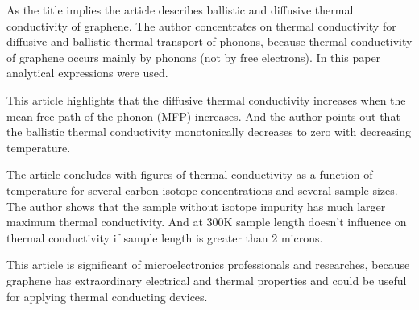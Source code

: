 \documentclass[main.tex]{subfiles}
\begin{document}
\setcounter{subsection}{7}
As the title implies the article describes ballistic and diffusive thermal conductivity of graphene.
The author concentrates on thermal conductivity for diffusive and ballistic thermal transport of phonons, because thermal conductivity of graphene occurs mainly by phonons (not by free electrons).
In this paper analytical expressions were used.\par
This article highlights that the diffusive thermal conductivity increases when the mean free path of the phonon (MFP) increases.
And the author points out that the ballistic thermal conductivity monotonically decreases to zero with decreasing temperature.\par
The article concludes with figures of thermal conductivity as a function of temperature for several carbon isotope concentrations and several sample sizes.
The author shows that the sample without isotope impurity has much larger maximum thermal conductivity.
And at 300K sample length doesn't influence on thermal conductivity if sample length is greater than 2 microns.\par
This article is significant of microelectronics professionals and researches, because graphene has extraordinary electrical and thermal properties and could be useful for applying thermal conducting devices.
\ \\\\
\newpage
\end{document}
